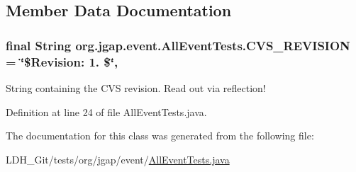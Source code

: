 \subsection{Member Data Documentation}
\hypertarget{classorg_1_1jgap_1_1event_1_1_all_event_tests_a3c0199222e6c234e5e60c19a3d4fd75e}{
\subsubsection[{C\-V\-S\-\_\-\-R\-E\-V\-I\-S\-I\-O\-N}]{\setlength{\rightskip}{0pt plus 5cm}final String org.\-jgap.\-event.\-All\-Event\-Tests.\-C\-V\-S\-\_\-\-R\-E\-V\-I\-S\-I\-O\-N = \char`\"{}\$Revision\-: 1. \$\char`\"{}\hspace{0.3cm}{\ttfamily [static]}, {\ttfamily [private]}}}\label{classorg_1_1jgap_1_1event_1_1_all_event_tests_a3c0199222e6c234e5e60c19a3d4fd75e}
String containing the C\-V\-S revision. Read out via reflection! 

Definition at line 24 of file All\-Event\-Tests.\-java.



The documentation for this class was generated from the following file\-:\begin{DoxyCompactItemize}
\item 
L\-D\-H\-\_\-\-Git/tests/org/jgap/event/\hyperlink{_all_event_tests_8java}{All\-Event\-Tests.\-java}\end{DoxyCompactItemize}
